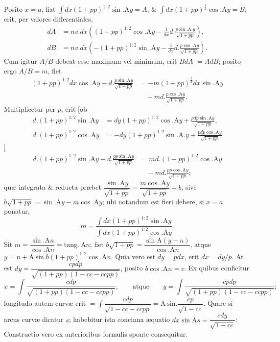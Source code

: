 Posito $x=a$, fiat $\int dx(1+pp)^{1:2}\sin.\mathrm{A}y=A$, \& $\int dx(1+pp)^{\frac12}\cos.\mathrm{A}y=B$; erit, per valores differentiales,
\[\begin{aligned}dA&=nv.dx\left((1+pp)^{1:2}\cos.\mathrm{A}y-\frac{1}{dx}d.\frac{p\sin.\mathrm{A}.y}{\sqrt{1+pp}}\right),\\dB&=nv.dx\left(-(1+pp)^{1:2}\sin.\mathrm{A}y-\frac{1}{dx}d.\frac{p\cos.\mathrm{A}y}{\sqrt{1+pp}}\right).\end{aligned}\]
Cum igitur $A/B$ debeat esse maximum vel minimum, erit $BdA$
$=AdB$; posito ergo $A/B=m$, fiet
\[\begin{aligned}(1+pp)^{1:2}dx\cos.\mathrm{A}y-d.\frac{p\sin.\mathrm{A}y}{\sqrt{1+pp}}&=-m(1+pp)^{\frac12}dx\sin.\mathrm{A}y\\&\quad-md.\frac{p\cos.\mathrm{A}y}{\sqrt{1+pp}}.\end{aligned}\]
Multiplicetur per $p$, erit [ob
\[\begin{aligned}d.(1+pp)^{1:2}\sin.\mathrm{A}y&=dy(1+pp)^{1:2}\cos.\mathrm{A}y+\frac{pdp\sin.\mathrm{A}y}{\sqrt{1+pp}},\\d.(1+pp)^{1:2}\cos.\mathrm{A}y&=-dy(1+pp)^{1:2}\sin.\mathrm{A}.y+\frac{pdp\cos.\mathrm{A}y}{\sqrt{1+pp}}\end{aligned}\]
]
\[\begin{aligned}d.(1+pp)^{1:2}\sin.\mathrm{A}y-d.\frac{pp\sin.\mathrm{A}y}{\sqrt{1+pp}}&=md.(1+pp)^{1:2}\cos.\mathrm{A}y\\&\quad-md.\frac{pp\cos.\mathrm{A}y}{\sqrt{1+pp}};\end{aligned}\]
quæ integrata \& reducta præbet $\dfrac{\sin.\mathrm{A}y}{\sqrt{1+pp}}=\dfrac{m\cos.\mathrm{A}y}{\sqrt{1+pp}}+b$, sive $b\sqrt{1+pp}=\sin.\mathrm{A}y-m\cos.\mathrm{A}y$; ubi notandum est fieri debere, si $x=a$ ponatur,
\[m=\frac{\int dx(1+pp)^{1:2}\sin.\mathrm{A}y}{\int dx(1+pp)^{1:2}\cos.\mathrm{A}y}.\]
Sit $m=\dfrac{\sin.\mathrm{A}n}{\cos.\mathrm{A}n}=\mathrm{tang.}\ \mathrm{A}n$; fiet $b\sqrt{1+pp}=\dfrac{\sin\mathrm{A}(y-n)}{\cos.\mathrm{A}n}$, atque $y=n+\mathrm{A\ sin.}b(1+pp)^{1:2}\cos.\mathrm{A}n$. Quia vero est $dy=pdx$, erit $dx=dy/p$. At est $dy=\dfrac{cpdp}{\sqrt{(1+pp)(1-cc-ccpp)}}$, posito $b\cos.\mathrm{A}n=c$. Ex quibus conficitur
\[x=\int\frac{cdp}{\sqrt{(1+pp)(1-cc-ccpp)}},\qquad\text{atque}\qquad y=\int\frac{cpdp}{\sqrt{(1+pp)(1-cc-ccpp)}};\]
longitudo autem curvæ erit $=\int\dfrac{cdp}{\sqrt{1-cc-ccpp}}=\mathrm{A\ sin.}\dfrac{cp}{\sqrt{1-cc}}$. Quare si arcus curvæ dicatur $s$; habebitur ista concinna æquatio $dx\sin\mathrm{A}s=\dfrac{cdy}{\sqrt{1-cc}}$: Constructio vero ex anterioribus formulis sponte consequitur.
